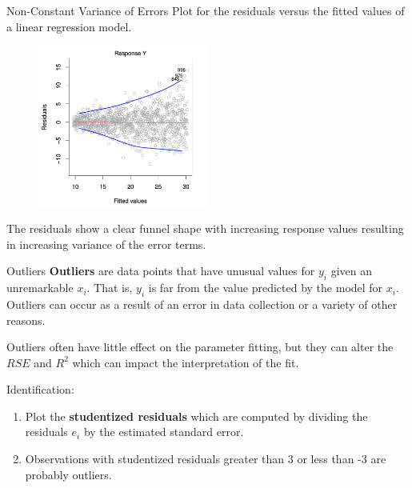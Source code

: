 \documentclass[
  ignorenonframetext,
  aspectratio=169,
]{beamer}
\begin{document}
\begin{frame}{Non-Constant Variance of Errors}
\protect\hypertarget{non-constant-variance-of-errors-1}{}
Plot for the residuals versus the fitted values of a linear regression
model.

\begin{figure}

{\centering \includegraphics[width=2.20833in,height=\textheight]{images/variance_errors.png}

}

\end{figure}

The residuals show a clear funnel shape with increasing response values
resulting in increasing variance of the error terms.
\end{frame}

\begin{frame}{Outliers}
\protect\hypertarget{outliers}{}
\textbf{Outliers} are data points that have unusual values for \(y_i\)
given an unremarkable \(x_i\). That is, \(y_i\) is far from the value
predicted by the model for \(x_i\). Outliers can occur as a result of an
error in data collection or a variety of other reasons.

Outliers often have little effect on the parameter fitting, but they can
alter the \(RSE\) and \(R^2\) which can impact the interpretation of the
fit.

Identification:

\begin{enumerate}
\item
  Plot the \textbf{studentized residuals} which are computed by dividing
  the residuals \(e_i\) by the estimated standard error.
\item
  Observations with studentized residuals greater than 3 or less than -3
  are probably outliers.
\end{enumerate}
\end{frame}
\end{document}
